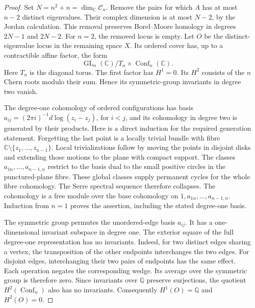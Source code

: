 \begin{proof}
Set $N=n^2+n=\dim_{\mathbb C}\mathcal C_n$.
Remove the pairs for which $A$ has at most $n-2$ distinct eigenvalues.
Their complex dimension is at most $N-2$, by the Jordan calculation.
This removal preserves Borel--Moore homology in degrees $2N-1$
and $2N-2$. For $n=2$, the removed locus is empty.
Let $O$ be the distinct-eigenvalue locus in the remaining space $X$.
Its ordered cover has, up to a contractible affine factor, the form
\[
 \operatorname{GL}_n(\mathbb C)/T_n
                    \times\operatorname{Conf}_n(\mathbb C).
\]
Here $T_n$ is the diagonal torus. The first factor has $H^1=0$.
Its $H^2$ consists of the $n$
Chern roots modulo their sum. Hence its symmetric-group invariants
in degree two vanish.

The degree-one cohomology of ordered configurations has basis
$a_{ij}=(2\pi i)^{-1}d\log(z_i-z_j)$, for $i<j$, and its
cohomology in degree two is generated by their products.
Here is a direct induction for the required generation statement.
Forgetting the last point is a locally trivial bundle with fibre
$\mathbb C\setminus\{z_1,\ldots,z_{n-1}\}$.
Local trivializations follow by moving the points in disjoint disks
and extending those motions to the plane with compact support.
The classes $a_{1n},\ldots,a_{n-1,n}$ restrict to the basis dual
to the small positive circles in the punctured-plane fibre.
These global classes supply permanent cycles for the whole fibre
cohomology. The Serre spectral sequence therefore collapses. The cohomology is a
free module over the base cohomology on $1,a_{1n},\ldots,a_{n-1,n}$.
Induction from $n=1$ proves the assertion, including the stated
degree-one basis.

The symmetric group permutes the unordered-edge basis $a_{ij}$.
It has a one-dimensional invariant subspace in degree one.
The exterior square of the full degree-one representation has no invariants.
Indeed, for two distinct edges sharing a vertex, the transposition
of the other endpoints interchanges the two edges.
For disjoint edges, interchanging their two pairs of endpoints has
the same effect. Each operation negates the corresponding wedge.
Its average over the symmetric group is therefore zero.
Since invariants over $\mathbb Q$ preserve surjections, the quotient
$H^2(\operatorname{Conf}_n)$ also has no invariants.
Consequently $H^1(O)=\mathbb Q$ and $H^2(O)=0$.


\end{proof}
